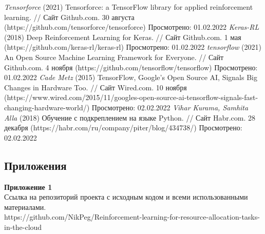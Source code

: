\documentclass{article}
\newcommand\zz[1]{\par{\normalsize\strut #1} \hfill\ignorespaces}
\begin{document}
\begin{center}
\begin{thebibliography}{}
 \textit{Tensorforce} (2021) Tensorforce: a TensorFlow library for applied reinforcement learning. // Сайт Github.com. 30 августа (https://github.com/tensorforce/tensorforce) Просмотрено: 01.02.2022
 \textit{Keras-RL} (2018) Deep Reinforcement Learning for Keras. // Сайт Github.com. 1 мая (https://github.com/keras-rl/keras-rl) Просмотрено: 01.02.2022
 \textit{tensorflow} (2021) An Open Source Machine Learning Framework for Everyone. // Сайт Github.com. 4 ноября (https://github.com/tensorflow/tensorflow) Просмотрено: 01.02.2022
 \textit{Cade Metz} (2015) TensorFlow, Google's Open Source AI, Signals Big Changes in Hardware Too. // Сайт Wired.com. 10 ноября (https://www.wired.com/2015/11/googles-open-source-ai-tensorflow-signals-fast-changing-hardware-world/) Просмотрено: 02.02.2022
 \textit{Vihar Kurama, Samhita Alla} (2018) Обучение с подкреплением на языке Python. // Сайт Habr.com. 28 декабря (https://habr.com/ru/company/piter/blog/434738/) Просмотрено: 02.02.2022
\end{thebibliography}
\end{center}
\newpage
\begin{center}
\section {Приложения}
\end{center}
\zz{}\textbf{Приложение 1\\}
Ссылка на репозиторий проекта с исходным кодом и всеми использованными материалами.\\
https://github.com/NikPeg/Reinforcement-learning-for-resource-allocation-tasks-in-the-cloud
\end{document}
